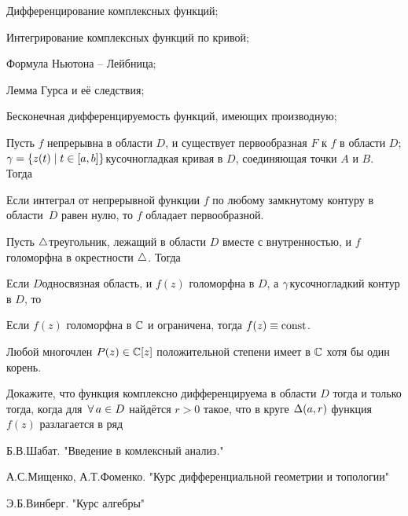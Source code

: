 \documentclass[a4paper,12pt]{article}
\begin{document}
\newpage
{}

\begin{nums}{-2}
\item Дифференцирование комплексных функций;
\item Интегрирование комплексных функций по кривой;
\item Формула Ньютона – Лейбница;
\item Лемма Гурса и её следствия;
\item Бесконечная дифференцируемость функций, имеющих производную;
\end{nums}



Пусть $f$ непрерывна в области $D$, и существует пер\-во\-об\-раз\-ная $F$ к $f$ в области $D$;
$\gamma=\left\{z(t) \;\rvert\; t \in [a,b]\right\}$\т кусочно\д гладкая кривая в $D$, соединяющая точки $A$ и $B$.
Тогда


  Если интеграл от непрерывной функции $f$ по любому замкнутому контуру в об\-лас\-ти~$D$ равен нулю, то
$f$ обладает первообразной.

Пусть $\triangle$\т треугольник, лежащий в области $D$ вместе с внутренностью, и $f$ голоморфна в
окрестности $\triangle$. Тогда



Если $D$\т односвязная область, и $f(z)$ голоморфна в $D$, а $\gamma$\т кусочно\д гладкий контур в $D$, то




Если $f(z)$ голоморфна в $\mathbb{C}$ и ограничена, тогда $f(z) \equiv \operatorname{const}$.


Любой многочлен $P(z) \in \mathbb{C}[z]$ положительной степени имеет в $\mathbb{C}$ хотя бы один корень.


Докажите, что функция комплексно дифференцируема в области $D$ тогда и только тогда, когда
для $\,\forall\, a \in D$ найдётся $r > 0$ такое, что в круге $\Delta(a,r)$ функция $f(z)$ разлагается в ряд




Б.В.Шабат. "Введение в комлексный анализ."

А.С.Мищенко, А.Т.Фоменко. "Курс дифференциальной геометрии и топологии"

Э.Б.Винберг. "Курс алгебры"
\end{document}
